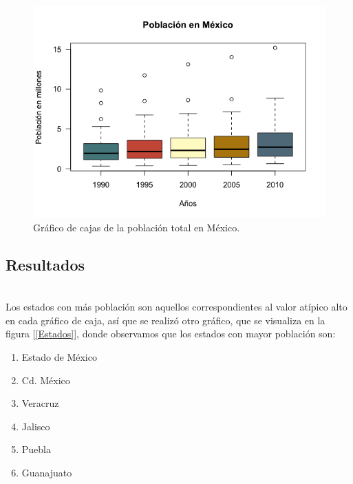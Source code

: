 \documentclass[12pt,letterpaper]{article}
\begin{document}
\begin{figure}[h!]
\centering

\includegraphics[scale=0.5]{Rplot02.PNG}
\caption{Gráfico de cajas de la población total en México.}
\label{PoblacionMexico}
\end{figure}

\subsection*{Resultados}~\\

 Los estados con más población son aquellos correspondientes al valor atípico alto en cada gráfico de caja, así que se realizó otro gráfico, que se visualiza en la figura [\ref{Estados}], donde observamos que los estados con mayor población son:

	\begin{enumerate}
	\item Estado de México
	\item Cd. México
	\item Veracruz
	\item Jalisco
	\item Puebla
	\item Guanajuato
	\end{enumerate}
\end{document}

